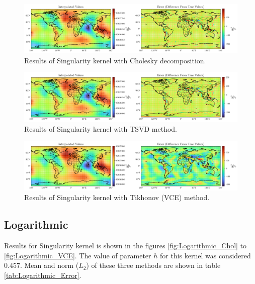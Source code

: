\documentclass[12pt]{article}
\begin{document}
	\begin{figure}[h!]
		\centering
		\includegraphics[width=16cm]{../Outputs/Singularity_Cholesky.pdf}
		\caption{Results of Singularity kernel with Cholesky decomposition.}
		\label{fig:Singularity_Chol}
	\end{figure}
	
	\clearpage
	
	\begin{figure}[h!]
		\centering
		\includegraphics[width=16cm]{../Outputs/Singularity_TSVD.pdf}
		\caption{Results of Singularity kernel with TSVD method.}
		\label{fig:Singularity_TSVD}
	\end{figure}
	
	\begin{figure}[h!]
		\centering
		\includegraphics[width=16cm]{../Outputs/Singularity_VCE.pdf}
		\caption{Results of Singularity kernel with Tikhonov (VCE) method.}
		\label{fig:Singularity_VCE}
	\end{figure}
	
	
	\subsection{Logarithmic}
	
	Results for Singularity kernel is shown in the figures \ref{fig:Logarithmic_Chol} to \ref{fig:Logarithmic_VCE}. The value of parameter $h$ for this kernel was considered 0.457. Mean and norm ($L_2$) of these three methods are shown in table \ref{tab:Logarithmic_Error}.
	
\end{document}
